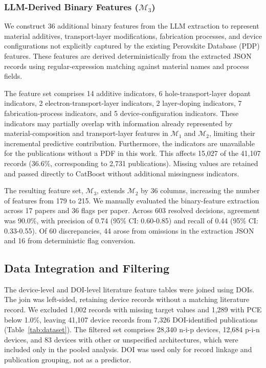 \documentclass[3p]{elsarticle}
\begin{document}
\subsubsection{LLM-Derived Binary Features ($\mathcal{M}_3$)}
\label{sec:binary_features}

We construct 36 additional binary features from the LLM extraction to represent material additives, transport-layer modifications, fabrication processes, and device configurations not explicitly captured by the existing Perovskite Database (PDP) features. These features are derived deterministically from the extracted JSON records using regular-expression matching against material names and process fields.

The feature set comprises 14 additive indicators, 6 hole-transport-layer dopant indicators, 2 electron-transport-layer indicators, 2 layer-doping indicators, 7 fabrication-process indicators, and 5 device-configuration indicators. These indicators may partially overlap with information already represented by material-composition and transport-layer features in $\mathcal{M}_1$ and $\mathcal{M}_2$, limiting their incremental predictive contribution. Furthermore, the indicators are unavailable for the publications without a PDF in this work. This affects 15,027 of the 41,107 records (36.6\%, corresponding to 2,731 publications). Missing values are retained and passed directly to CatBoost without additional missingness indicators.

The resulting feature set, $\mathcal{M}_3$, extends $\mathcal{M}_2$ by 36 columns, increasing the number of features from 179 to 215. We manually evaluated the binary-feature extraction across 17 papers and 36 flags per paper. Across 603 resolved decisions, agreement was 90.0\%, with precision of 0.74 (95\% CI: 0.60-0.85) and recall of 0.44 (95\% CI: 0.33-0.55). Of 60 discrepancies, 44 arose from omissions in the extraction JSON and 16 from deterministic flag conversion.

\subsection{Data Integration and Filtering}
\label{sec:integration}

The device-level and DOI-level literature feature tables were joined using DOIs. The join was left-sided, retaining device records without a matching literature record. We excluded 1,002 records with missing target values and 1,289 with PCE below 1.0\%, leaving 41,107 device records from 7,326 DOI-identified publications (Table~\ref{tab:dataset}). The filtered set comprises 28,340 n-i-p devices, 12,684 p-i-n devices, and 83 devices with other or unspecified architectures, which were included only in the pooled analysis. DOI was used only for record linkage and publication grouping, not as a predictor.
\end{document}
